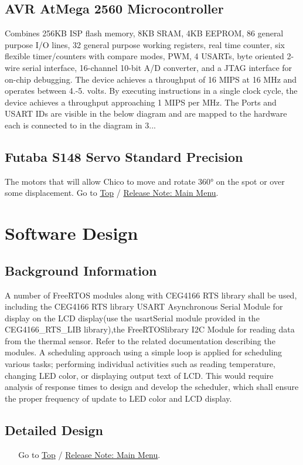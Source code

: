 \hypertarget{hardware_design_avr}{}\subsection{A\+V\+R At\+Mega 2560 Microcontroller}\label{hardware_design_avr}
Combines 256\+KB I\+SP flash memory, 8\+KB S\+R\+AM, 4\+KB E\+E\+P\+R\+OM, 86 general purpose I/O lines, 32 general purpose working registers, real time counter, six flexible timer/counters with compare modes, P\+WM, 4 U\+S\+A\+R\+Ts, byte oriented 2-\/wire serial interface, 16-\/channel 10-\/bit A/D converter, and a J\+T\+AG interface for on-\/chip debugging. The device achieves a throughput of 16 M\+I\+PS at 16 M\+Hz and operates between 4.-\/5. volts. By executing instructions in a single clock cycle, the device achieves a throughput approaching 1 M\+I\+PS per M\+Hz. The Ports and U\+S\+A\+RT I\+Ds are visible in the below diagram and are mapped to the hardware each is connected to in the diagram in 3...  \hypertarget{hardware_design_servo}{}\subsection{Futaba S148 Servo Standard Precision}\label{hardware_design_servo}
The motors that will allow Chico to move and rotate 360° on the spot or over some displacement.  Go to \hyperlink{hardware_design}{Top} / \hyperlink{product_release_main_page}{Release Note\+: Main Menu}. \hypertarget{software_design}{}\section{Software Design}\label{software_design}
\hypertarget{software_design_software_background}{}\subsection{Background Information}\label{software_design_software_background}
A number of Free\+R\+T\+OS modules along with C\+E\+G4166 R\+TS library shall be used, including the C\+E\+G4166 R\+TS library U\+S\+A\+RT Asynchronous Serial Module for display on the L\+CD display(use the usart\+Serial module provided in the C\+E\+G4166\+\_\+\+R\+T\+S\+\_\+\+L\+I\+B library),the Free\+R\+T\+O\+Slibrary I2C Module for reading data from the thermal sensor. Refer to the related documentation describing the modules. A scheduling approach using a simple loop is applied for scheduling various tasks; performing individual activities such as reading temperature, changing L\+ED color, or displaying output text of L\+CD. This would require analysis of response times to design and develop the scheduler, which shall ensure the proper frequency of update to L\+ED color and L\+CD display.\hypertarget{software_design_detailed_design}{}\subsection{Detailed Design}\label{software_design_detailed_design}
~\newline
~\newline
 Go to \hyperlink{software_design}{Top} / \hyperlink{product_release_main_page}{Release Note\+: Main Menu}. 